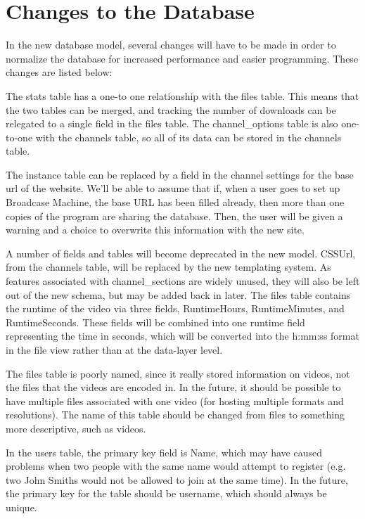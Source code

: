 \documentclass[a4paper,12pt]{report}
\begin{document}
\section{Changes to the Database}
In the new database model, several changes will have to be made in order to normalize the database for increased performance and easier programming. These changes are listed below:


The stats table has a one-to one relationship with the files table. This means that the two tables can be merged, and tracking the number of downloads can be relegated to a single field in the files table. The channel\_options table is also one-to-one with the channels table, so all of its data can be stored in the channels table.


The instance table can be replaced by a field in the channel settings for the base url of the website. We'll be able to assume that if, when a user goes to set up Broadcase Machine, the base URL has been filled already, then more than one copies of the program are sharing the database. Then, the user will be given a warning and a choice to overwrite this information with the new site.


A number of fields and tables will become deprecated in the new model. CSSUrl, from the channels table, will be replaced by the new templating system. As features associated with channel\_sections are widely unused, they will also be left out of the new schema, but may be added back in later. The files table contains the runtime of the video via three fields, RuntimeHours, RuntimeMinutes, and RuntimeSeconds. These fields will be combined into one runtime field representing the time in seconds, which will be converted into the h:mm:ss format in the file view rather than at the data-layer level.


The files table is poorly named, since it really stored information on videos, not the files that the videos are encoded in. In the future, it should be possible to have multiple files associated with one video (for hosting multiple formats and resolutions). The name of this table should be changed from files to something more descriptive, such as videos.


In the users table, the primary key field is Name, which may have caused problems when two people with the same name would attempt to register (e.g. two John Smiths would not be allowed to join at the same time). In the future, the primary key for the table should be username, which should always be unique.
\end{document}
